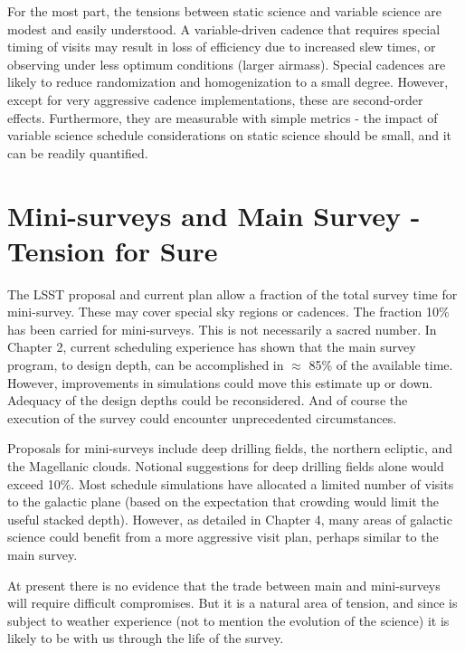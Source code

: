 For the most part, the tensions between static science and variable
science are modest and easily understood.  A variable-driven cadence
that requires special timing of visits may result in loss of efficiency
due to increased slew times, or observing under less optimum conditions
(larger airmass).  Special cadences are likely to reduce randomization
and homogenization to a small degree. However, except for very
aggressive cadence implementations, these are second-order effects.
Furthermore, they are measurable with simple metrics - the impact of
variable science schedule considerations on static science should be
small, and it can be readily quantified.


\section{Mini-surveys and Main Survey - Tension for Sure}

The LSST proposal and current plan allow a fraction of the total survey
time for mini-survey. These may cover special sky regions or cadences.
The fraction 10\% has been carried for mini-surveys.  This is not
necessarily a sacred number. In Chapter 2, current scheduling experience
has shown that the main survey program, to design depth, can be
accomplished in $\approx$ 85\% of the available time. However,
improvements in simulations could move this estimate up or down.
Adequacy of the design depths could be reconsidered.  And of course the
execution of the survey could encounter unprecedented circumstances.

Proposals for mini-surveys include deep drilling fields, the northern
ecliptic, and the Magellanic clouds. Notional suggestions for deep
drilling fields alone would exceed 10\%.   Most schedule simulations
have allocated a limited number of visits to the galactic plane (based
on the expectation that crowding would limit the useful stacked depth).
However, as detailed in Chapter 4, many areas of galactic science could
benefit from a more aggressive visit plan, perhaps similar to the main
survey.

At present there is no evidence that the trade between main and
mini-surveys will require difficult compromises.  But it is a natural
area of tension, and since is subject to weather experience (not to
mention the evolution of the science) it is likely to be with us through
the life of the survey.

